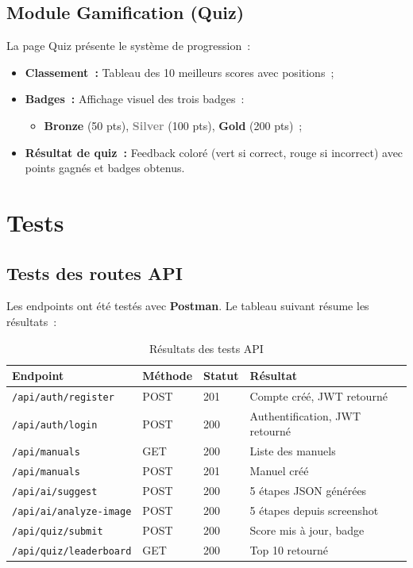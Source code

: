 \documentclass[12pt, a4paper, twoside, openany]{report}
\begin{document}
\subsection{Module Gamification (Quiz)}

La page Quiz pr\'esente le syst\`eme de progression~:
\begin{itemize}
  \item \textbf{Classement~:} Tableau des 10 meilleurs scores avec positions~;
  \item \textbf{Badges~:} Affichage visuel des trois badges~:
    \begin{itemize}
      \item \textcolor{orange!80!brown}{\textbf{Bronze}} (50 pts),
            \textcolor{gray}{\textbf{Silver}} (100 pts),
            \textcolor{yellow!70!orange}{\textbf{Gold}} (200 pts)~;
    \end{itemize}
  \item \textbf{R\'esultat de quiz~:} Feedback color\'e (vert si correct, rouge si
        incorrect) avec points gagn\'es et badges obtenus.
\end{itemize}

\section{Tests}

\subsection{Tests des routes API}

Les endpoints ont \'et\'e test\'es avec \textbf{Postman}. Le tableau suivant r\'esume
les r\'esultats~:

\begin{table}[H]
  \centering
  \caption{R\'esultats des tests API}
  \label{tab:tests-api}
  \begin{tabularx}{\textwidth}{l l l X}
    \toprule
    \textbf{Endpoint} & \textbf{M\'ethode} & \textbf{Statut}
      & \textbf{R\'esultat} \\
    \midrule
    \texttt{/api/auth/register}    & POST & 201 & Compte cr\'e\'e, JWT retourn\'e \\
    \texttt{/api/auth/login}       & POST & 200 & Authentification, JWT retourn\'e \\
    \texttt{/api/manuals}          & GET  & 200 & Liste des manuels \\
    \texttt{/api/manuals}          & POST & 201 & Manuel cr\'e\'e \\
    \texttt{/api/ai/suggest}       & POST & 200 & 5 \'etapes JSON g\'en\'er\'ees \\
    \texttt{/api/ai/analyze-image} & POST & 200 & 5 \'etapes depuis screenshot \\
    \texttt{/api/quiz/submit}      & POST & 200 & Score mis \`a jour, badge \\
    \texttt{/api/quiz/leaderboard} & GET  & 200 & Top 10 retourn\'e \\
    \bottomrule
  \end{tabularx}
\end{table}
\end{document}
